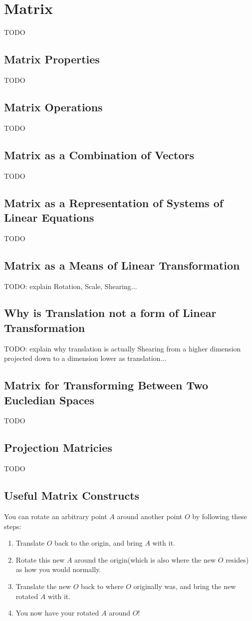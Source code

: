\section{Matrix}
TODO

\subsection{Matrix Properties}
TODO

\subsection{Matrix Operations}
TODO

\subsection{Matrix as a Combination of Vectors}
TODO

\subsection{Matrix as a Representation of Systems of Linear Equations}
TODO

\subsection{Matrix as a Means of Linear Transformation}
TODO: explain Rotation, Scale, Shearing...

\subsection{Why is Translation not a form of Linear Transformation}
TODO: explain why translation is actually Shearing from a higher dimension projected down
to a dimension lower as translation...

\subsection{Matrix for Transforming Between Two Eucledian Spaces}
TODO

\subsection{Projection Matricies}
TODO

\subsection{Useful Matrix Constructs}
You can rotate an arbitrary point $A$ around another point $O$ by following these steps:
\begin{enumerate}
    \item Translate $O$ back to the origin, and bring $A$ with it.
    \item Rotate this new $A$ around the origin(which is also where the new $O$ resides)
        as how you would normally.
    \item Translate the new $O$ back to where $O$ originally was, and bring the new rotated $A$ with it.
    \item You now have your rotated $A$ around $O$!
\end{enumerate}

